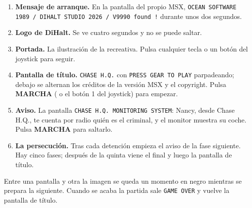 \begin{enumerate}
\item \textbf{Mensaje de arranque.} En la pantalla del propio MSX, \texttt{OCEAN SOFTWARE 1989 / DIHALT STUDIO 2026 / V9990 found !} durante unos dos segundos.
\item \textbf{Logo de DiHalt.} Se ve cuatro segundos y no se puede saltar.
\item \textbf{Portada.} La ilustración de la recreativa. Pulsa cualquier tecla o un botón del joystick para seguir.
\item \textbf{Pantalla de título.} \texttt{CHASE H.Q.} con \texttt{PRESS GEAR TO PLAY} parpadeando; debajo se alternan los créditos de la versión MSX y el copyright. Pulsa \textbf{MARCHA} ( o el botón 1 del joystick) para empezar.
\item \textbf{Aviso.} La pantalla \texttt{CHASE H.Q. MONITORING SYSTEM}: Nancy, desde Chase H.Q., te cuenta por radio quién es el criminal, y el monitor muestra su coche. Pulsa \textbf{MARCHA} para saltarlo.
\item \textbf{La persecución.} Tras cada detención empieza el aviso de la fase siguiente. Hay cinco fases; después de la quinta viene el final y luego la pantalla de título.
\end{enumerate}

Entre una pantalla y otra la imagen se queda un momento en negro mientras se prepara la siguiente. Cuando se acaba la partida sale \texttt{GAME OVER} y vuelve la pantalla de título.

